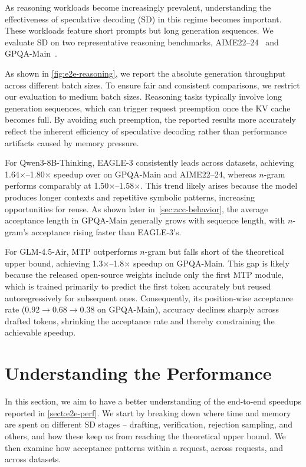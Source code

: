 \documentclass{article}
\begin{document}
As reasoning workloads become increasingly prevalent, understanding the effectiveness of speculative decoding (SD) in this regime becomes important. These workloads feature short prompts but long generation sequences. We evaluate SD on two representative reasoning benchmarks, AIME22–24~\cite{AIME-HF} and GPQA-Main~\cite{rein2023gpqagraduatelevelgoogleproofqa}.

As shown in \autoref{fig:e2e-reasoning}, we report the absolute generation throughput across different batch sizes. To ensure fair and consistent comparisons, we restrict our evaluation to medium batch sizes. Reasoning tasks typically involve long generation sequences, which can trigger request preemption once the KV cache becomes full. By avoiding such preemption, the reported results more accurately reflect the inherent efficiency of speculative decoding rather than performance artifacts caused by memory pressure.

For Qwen3-8B-Thinking, EAGLE-3 consistently leads across datasets, achieving 1.64$\times$--1.80$\times$ speedup over on GPQA-Main and AIME22–24, whereas $n$-gram performs comparably at 1.50$\times$--1.58$\times$. This trend likely arises because the model produces longer contexts and repetitive symbolic patterns, increasing opportunities for reuse. As shown later in~\autoref{sec:acc-behavior}, the average acceptance length in GPQA-Main generally grows with sequence length, with $n$-gram’s acceptance rising faster than EAGLE-3’s.

For GLM-4.5-Air, MTP outperforms $n$-gram but falls short of the theoretical upper bound, achieving 1.3$\times$--1.8$\times$ speedup on GPQA-Main. This gap is likely because the released open-source weights include only the first MTP module, which is trained primarily to predict the first token accurately but reused autoregressively for subsequent ones. Consequently, its position-wise acceptance rate (\(0.92 \rightarrow 0.68 \rightarrow 0.38\) on GPQA-Main), accuracy declines sharply across drafted tokens, shrinking the acceptance rate and thereby constraining the achievable speedup.





\section{Understanding the Performance}
\label{sec:understand-perf}
In this section, we aim to have a better understanding of the end-to-end speedups reported in \autoref{sect:e2e-perf}. 
We start by breaking down where time and memory are spent on different SD stages -- drafting, verification, rejection sampling, and others, and how these keep us from reaching the theoretical upper bound. We then examine how acceptance patterns within a request, across requests, and across datasets. 
\end{document}
